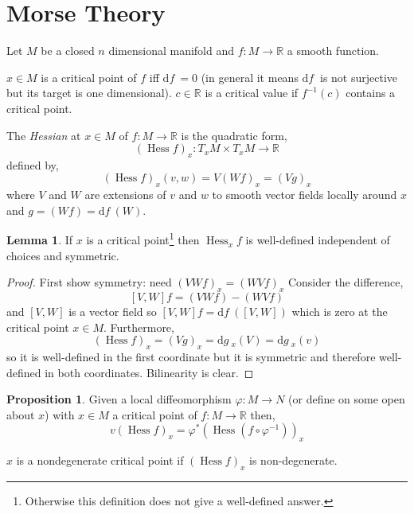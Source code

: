 \documentclass[12pt]{extarticle}
\renewcommand{\d}[1]{ \mathrm{d}#1 \:}
\DeclareMathOperator{\Hess}{\mathrm{Hess}}
\theoremstyle{definition}
\newtheorem{lemma}[theorem]{Lemma}
\newtheorem{proposition}[theorem]{Proposition}
\newenvironment{definition}[1][Definition:]{\begin{trivlist}
\item[\hskip \labelsep {\bfseries #1}]}{\end{trivlist}}
\begin{document}
\section{Morse Theory}

\newcommand{\RR}{\mathbb{R}}

Let $M$ be a closed $n$ dimensional manifold and $f : M \to \RR$ a smooth function. 

\begin{definition}
$x \in M$ is a critical point of $f$ iff $\d{f} = 0$ (in general it means $\d{f}$ is not surjective but its target is one dimensional). $c \in \RR$ is a critical value if $f^{-1}(c)$ contains a critical point. 
\end{definition}

\begin{definition}
The \textit{Hessian} at $x \in M$ of $f : M \to \RR$ is the quadratic form,
\[ (\Hess f)_x : T_x M \times T_x M \to \RR \]
defined by,
\[ (\Hess f)_x(v,w) = V(W f)_x = (V g)_x \]
where $V$ and $W$ are extensions of $v$ and $w$ to smooth vector fields locally around $x$ and $g = (W f) = \d{f}(W)$. 
\end{definition}

\begin{lemma}
If $x$ is a critical point\footnote{Otherwise this definition does not give a well-defined answer.} then $\Hess_x f$ is well-defined independent of choices and symmetric.
\end{lemma}

\begin{proof}
First show symmetry: need $(V W f)_x = (W V f)_x$ Consider the difference,
\[ [V, W]f = (V W f) - (W V f) \]
and $[V, W]$ is a vector field so $[V, W] f  = \d{f}([V, W])$ which is zero at the critical point $x \in M$. Furthermore, 
\[ (\Hess f)_x = (V g)_x = \d{g}_x(V) = \d{g}_x(v) \]
so it is well-defined in the first coordinate but it is symmetric and therefore well-defined in both coordinates. Bilinearity is clear. 
\end{proof}

\begin{proposition}
Given a local diffeomorphism $\varphi : M \to N$ (or define on some open about $x$) with $x \in M$ a critical point of $f : M \to \RR$ then,
\[v(\Hess f)_x = \varphi^* (\Hess (f \circ \varphi^{-1}))_x \]
\end{proposition}

\begin{definition}
$x$ is a nondegenerate critical point if $(\Hess f)_x$ is non-degenerate.
\end{definition}
\end{document}
